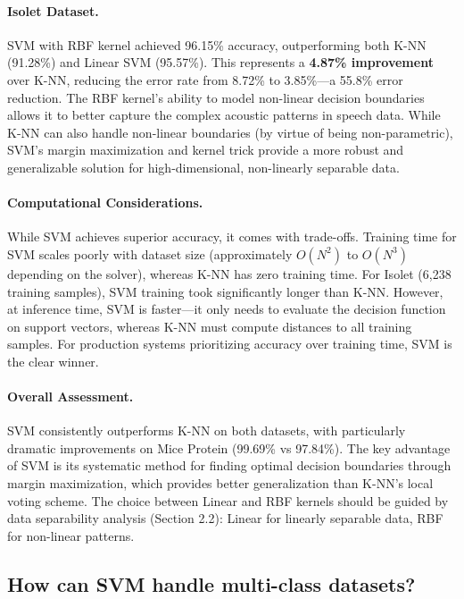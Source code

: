 \documentclass[12pt]{article}
\begin{document}
\paragraph{Isolet Dataset.} SVM with RBF kernel achieved 96.15\% accuracy, outperforming both K-NN (91.28\%) and Linear SVM (95.57\%). This represents a \textbf{4.87\% improvement} over K-NN, reducing the error rate from 8.72\% to 3.85\%—a 55.8\% error reduction. The RBF kernel's ability to model non-linear decision boundaries allows it to better capture the complex acoustic patterns in speech data. While K-NN can also handle non-linear boundaries (by virtue of being non-parametric), SVM's margin maximization and kernel trick provide a more robust and generalizable solution for high-dimensional, non-linearly separable data.

\paragraph{Computational Considerations.} While SVM achieves superior accuracy, it comes with trade-offs. Training time for SVM scales poorly with dataset size (approximately $O(N^2)$ to $O(N^3)$ depending on the solver), whereas K-NN has zero training time. For Isolet (6,238 training samples), SVM training took significantly longer than K-NN. However, at inference time, SVM is faster—it only needs to evaluate the decision function on support vectors, whereas K-NN must compute distances to all training samples. For production systems prioritizing accuracy over training time, SVM is the clear winner.

\paragraph{Overall Assessment.} SVM consistently outperforms K-NN on both datasets, with particularly dramatic improvements on Mice Protein (99.69\% vs 97.84\%). The key advantage of SVM is its systematic method for finding optimal decision boundaries through margin maximization, which provides better generalization than K-NN's local voting scheme. The choice between Linear and RBF kernels should be guided by data separability analysis (Section 2.2): Linear for linearly separable data, RBF for non-linear patterns.

\subsection{How can SVM handle multi-class datasets?}
\end{document}
